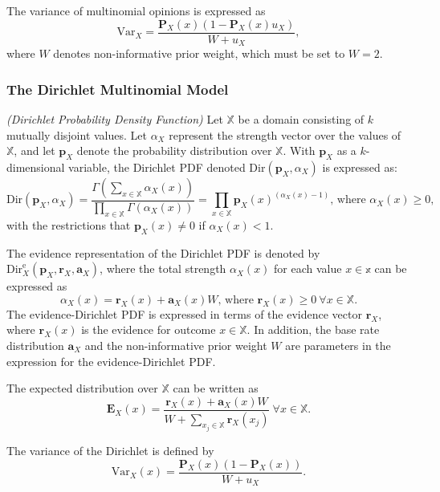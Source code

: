 The variance of multinomial opinions is expressed as
\begin{equation}
	\mathrm{Var}_X = \dfrac{\mathbf{P}_X(x)(1 - \mathbf{P}_X(x)u_X)}{W + u_X},
\end{equation}
where $W$ denotes non-informative prior weight, which must be set to $W = 2$.

\subsubsection{The Dirichlet Multinomial Model}

\begin{definition}
	\emph{(Dirichlet Probability Density Function)} Let $\mathbb{X}$ be a domain consisting of $k$ mutually disjoint values. Let $\alpha_X$ represent the strength vector over the
values of $\mathbb{X}$, and let $\mathbf{p}_X$ denote the probability distribution over $\mathbb{X}$. With $\mathbf{p}_X$ as a
$k$-dimensional variable, the Dirichlet PDF denoted $\mathrm{Dir}(\mathbf{p}_X, \alpha_{X})$ is expressed as:
	\begin{equation}
		\mathrm{Dir}(\mathbf{p}_X, \alpha_X) = \dfrac{\Gamma\left(\sum\limits_{x \in \mathbb{X}} \alpha_X(x)\right)}{\prod\limits_{x \in \mathbb{X}} \Gamma(\alpha_X(x))} = \prod\limits_{x \in \mathbb{X}} \mathbf{p}_X(x)^{(\alpha_X(x)-1)} \text{, where } \alpha_X(x) \geq 0\text{,}
	\end{equation}
	with the restrictions that $\mathbf{p}_X(x) \neq 0$ if $\alpha_X(x)	< 1$.
\end{definition}

The evidence representation of the Dirichlet PDF is denoted by $\mathrm{Dir}^{\mathrm{e}}_X(\mathbf{p}_X, \mathbf{r}_X, \mathbf{a}_X)$, where the total strength $\alpha_X(x)$ for each value $x \in \mathbb{x}$ can be expressed as
\begin{equation}
    \alpha_X(x) = \mathbf{r}_X(x) + \mathbf{a}_X(x)W\text{, where }\mathbf{r}_X(x) \geq 0\ \forall x \in \mathbb{X}\text{.}
\end{equation}
The evidence-Dirichlet PDF is expressed in terms of the evidence vector $\mathbf{r}_X$, where $\mathbf{r}_X(x)$ is the evidence for outcome $x \in \mathbb{X}$. In addition, the base rate distribution $\mathbf{a}_X$ and the non-informative prior weight $W$ are parameters in the expression for
the evidence-Dirichlet PDF.

The expected distribution over $\mathbb{X}$ can be written as
\begin{equation}
    \mathbf{E}_X(x) = \dfrac{\mathbf{r}_X(x) + \mathbf{a}_X(x)W}{W + \sum\limits_{x_j \in \mathbb{X}} \mathbf{r}_X(x_j)}\ \forall x \in \mathbb{X}.
\end{equation}

The variance of the Dirichlet is defined by
\begin{equation}
    \mathrm{Var}_X(x) = \dfrac{\mathbf{P}_X(x)(1 - \mathbf{P}_X(x))}{W + u_X}\text{.}
\end{equation}

